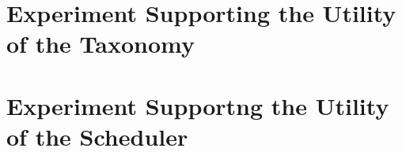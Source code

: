 \section{Experiment Supporting the Utility of the Taxonomy}

\section{Experiment Supportng the Utility of the Scheduler}
